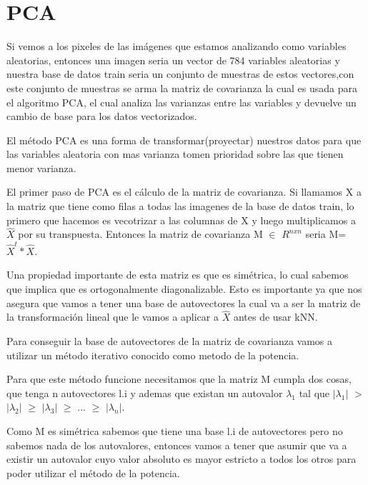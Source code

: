 \section{PCA}
Si vemos a los pixeles de las imágenes que estamos analizando como variables aleatorias, entonces una imagen seria un vector de 784 variables aleatorias y nuestra base de datos train seria un conjunto de muestras de estos vectores,con este conjunto de muestras se arma la matriz de covarianza la cual es usada para el algoritmo PCA, el cual analiza las varianzas entre las variables y devuelve un cambio de base para los datos vectorizados. \par
\indent El método PCA es una forma de transformar(proyectar) nuestros datos para que las variables aleatoria con mas varianza tomen prioridad sobre las que tienen menor varianza.\par
\indent El primer paso de PCA es el cálculo de la matriz de covarianza. Si llamamos X a la matriz que tiene como filas a todas las imagenes de la base de datos train, lo primero que hacemos es vecotrizar a las columnas de X y luego multiplicamos a $\hat{X}$ por su transpuesta. Entonces la matriz de covarianza M $\in$ $R^{nxn}$  seria M=$\hat{X}^{t}*\hat{X}$. \par
\indent Una propiedad importante de esta matriz es que es simétrica, lo cual sabemos que implica que es ortogonalmente diagonalizable. Esto es importante ya que nos asegura que vamos a tener una base de autovectores la cual va a ser la matriz de la transformación lineal que le vamos a aplicar a $\hat{X}$ antes de usar kNN. \par
\indent Para conseguir la base de autovectores de la matriz de covarianza vamos a utilizar un método iterativo conocido como metodo de la potencia. \par
\indent Para que este método funcione necesitamos que la matriz M cumpla dos cosas, que tenga n autovectores l.i y ademas que existan un autovalor $\lambda_1$ tal que $|\lambda_1|$ $>$ $|\lambda_2|$ $\geq$ $|\lambda_3|$ $\geq$ ... $\geq$ $|\lambda_n|$. \par
\indent Como M es simétrica sabemos que tiene una base l.i de autovectores pero no sabemos nada de los autovalores, entonces vamos a tener que asumir que va a existir un autovalor cuyo valor absoluto es mayor estricto a todos los otros para poder utilizar el método de la potencia.\par
